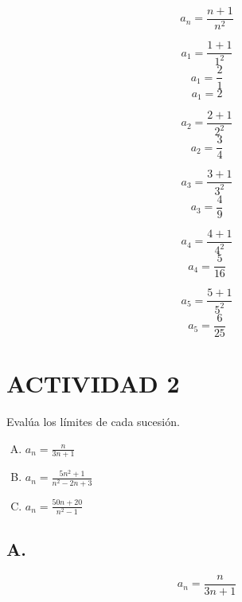 \documentclass[12pt, letterpaper, twoside]{article}
\begin{document}
\[ a_n = \frac{n + 1}{n^2} \]

\[ a_1 = \frac{1 + 1}{1^2} \]
\[ a_1 = \frac{2}{1} \]
\[ a_1 = 2 \]


\[ a_2 = \frac{2 + 1}{2^2} \]
\[ a_2 = \frac{3}{4} \]

\[ a_3 = \frac{3 + 1}{3^2} \]
\[ a_3 = \frac{4}{9} \]

\[ a_4 = \frac{4 + 1}{4^2} \]
\[ a_4 = \frac{5}{16} \]

\[ a_5 = \frac{5 + 1}{5^2} \]
\[ a_5 = \frac{6}{25} \]


\section*{ACTIVIDAD 2}

Evalúa los límites de cada sucesión.

\begin{enumerate}[A.]
    \item $a_n = \frac{n}{3n + 1}$
    \item $a_n = \frac{5n^2 + 1}{n^2 - 2n + 3}$
    \item $a_n = \frac{50n + 20}{n^2 - 1}$
\end{enumerate}

\subsection*{A.}

\[ a_n = \frac{n}{3n + 1} \]
\end{document}
